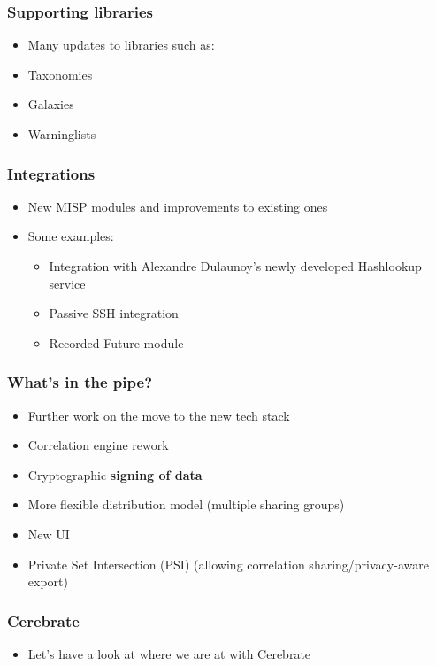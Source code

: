 \begin{frame}
\frametitle{Supporting libraries}
\begin{itemize}
	\item Many updates to libraries such as:
        \item Taxonomies
        \item Galaxies
        \item Warninglists
\end{itemize}
\end{frame}

\begin{frame}
\frametitle{Integrations}
\begin{itemize}
	\item New MISP modules and improvements to existing ones
        \item Some examples:
        \begin{itemize}
            \item Integration with Alexandre Dulaunoy's newly developed Hashlookup service
            \item Passive SSH integration
            \item Recorded Future module
        \end{itemize}
\end{itemize}
\end{frame}

\begin{frame}
\frametitle{What's in the pipe?}
\begin{itemize}
	\item Further work on the move to the new tech stack
        \item Correlation engine rework
        \item Cryptographic {\bf signing of data}
        \item More flexible distribution model (multiple sharing groups)
        \item New UI
        \item Private Set Intersection (PSI) (allowing correlation sharing/privacy-aware export)
\end{itemize}
\end{frame}

\begin{frame}
\frametitle{Cerebrate}
\begin{itemize}
        \item Let's have a look at where we are at with Cerebrate
\end{itemize}
\end{frame}

